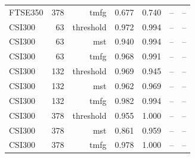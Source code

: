 \begin{tabular}{lrrrrrr}
FTSE350 & 378 & tmfg & 0.677 & 0.740 & -- & -- \\
CSI300 & 63 & threshold & 0.972 & 0.994 & -- & -- \\
CSI300 & 63 & mst & 0.940 & 0.994 & -- & -- \\
CSI300 & 63 & tmfg & 0.968 & 0.991 & -- & -- \\
CSI300 & 132 & threshold & 0.969 & 0.945 & -- & -- \\
CSI300 & 132 & mst & 0.962 & 0.969 & -- & -- \\
CSI300 & 132 & tmfg & 0.982 & 0.994 & -- & -- \\
CSI300 & 378 & threshold & 0.955 & 1.000 & -- & -- \\
CSI300 & 378 & mst & 0.861 & 0.959 & -- & -- \\
CSI300 & 378 & tmfg & 0.978 & 1.000 & -- & -- \\
\bottomrule
\end{tabular}
